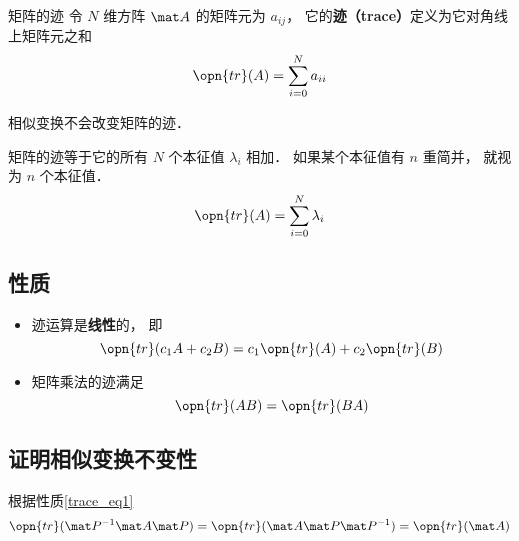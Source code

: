 
\begin{definition}{矩阵的迹}
令 $N$ 维方阵 $\mat A$ 的矩阵元为 $a_{ij}$， 它的\textbf{迹（trace）}定义为它对角线上矩阵元之和
\begin{equation}
\opn{tr}(A) = \sum_{i=0}^N a_{ii}
\end{equation}
\end{definition}

\begin{theorem}{}
相似变换不会改变矩阵的迹．
\end{theorem}

\begin{corollary}{}
矩阵的迹等于它的所有 $N$ 个本征值 $\lambda_i$ 相加． 如果某个本征值有 $n$ 重简并， 就视为 $n$ 个本征值．
\begin{equation}
\opn{tr}(A) = \sum_{i=0}^N \lambda_i
\end{equation}
\end{corollary}

\subsection{性质}
\begin{itemize}
\item 迹运算是\textbf{线性}的， 即
\begin{equation}
\opn{tr}(c_1A+c_2B) = c_1\opn{tr}(A) + c_2\opn{tr}(B)
\end{equation}

\item 矩阵乘法的迹满足
\begin{equation}\label{trace_eq1}
\opn{tr}(AB) = \opn{tr}(BA)
\end{equation}
\end{itemize}

\subsection{证明相似变换不变性}
根据性质\autoref{trace_eq1}
\begin{equation}
\opn{tr}(\mat P^{-1}\mat A\mat P) = \opn{tr}(\mat A\mat P\mat P^{-1}) = \opn{tr}(\mat A)
\end{equation}
